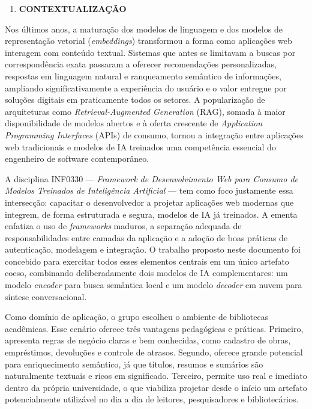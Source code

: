 \documentclass[
]{article}
\begin{document}
\begin{enumerate}
\def\labelenumi{\arabic{enumi}.}
\setcounter{enumi}{1}
\item
  \protect{}\label{_Toc230227801}{}\textbf{CONTEXTUALIZAÇÃO}
\end{enumerate}

Nos últimos anos, a maturação dos modelos de linguagem e dos modelos de
representação vetorial (\emph{embeddings}) transformou a forma como
aplicações web interagem com conteúdo textual. Sistemas que antes se
limitavam a buscas por correspondência exata passaram a oferecer
recomendações personalizadas, respostas em linguagem natural e
ranqueamento semântico de informações, ampliando significativamente a
experiência do usuário e o valor entregue por soluções digitais em
praticamente todos os setores. A popularização de arquiteturas como
\emph{Retrieval-Augmented Generation} (RAG), somada à maior
disponibilidade de modelos abertos e à oferta crescente de
\emph{Application Programming Interfaces} (APIs) de consumo, tornou a
integração entre aplicações web tradicionais e modelos de IA treinados
uma competência essencial do engenheiro de software contemporâneo.

A disciplina INF0330 --- \emph{Framework de Desenvolvimento Web para
Consumo de Modelos Treinados de Inteligência Artificial} --- tem como
foco justamente essa intersecção: capacitar o desenvolvedor a projetar
aplicações web modernas que integrem, de forma estruturada e segura,
modelos de IA já treinados. A ementa enfatiza o uso de \emph{frameworks}
maduros, a separação adequada de responsabilidades entre camadas da
aplicação e a adoção de boas práticas de autenticação, modelagem e
integração. O trabalho proposto neste documento foi concebido para
exercitar todos esses elementos centrais em um único artefato coeso,
combinando deliberadamente dois modelos de IA complementares: um modelo
\emph{encoder} para busca semântica local e um modelo \emph{decoder} em
nuvem para síntese conversacional.

Como domínio de aplicação, o grupo escolheu o ambiente de bibliotecas
acadêmicas. Esse cenário oferece três vantagens pedagógicas e práticas.
Primeiro, apresenta regras de negócio claras e bem conhecidas, como
cadastro de obras, empréstimos, devoluções e controle de atrasos.
Segundo, oferece grande potencial para enriquecimento semântico, já que
títulos, resumos e sumários são naturalmente textuais e ricos em
significado. Terceiro, permite uso real e imediato dentro da própria
universidade, o que viabiliza projetar desde o início um artefato
potencialmente utilizável no dia a dia de leitores, pesquisadores e
bibliotecários.
\end{document}
